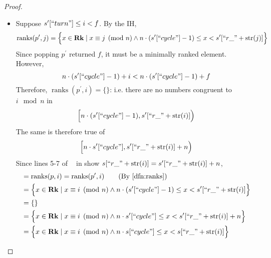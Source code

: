 \documentclass{amsart}
\DeclareMathOperator{\Rk}{\mathbf{Rk}}
\DeclareMathOperator{\zpostpop}{z_{\mathrm{post-pop}}}
\DeclareMathOperator{\ranks}{\mathrm{ranks}}
\theoremstyle{definition}
\begin{document}
\begin{proof}
\begin{enumerate}
\begin{enumerate}
\begin{itemize}
                        \item Suppose $s^\prime[``turn"] \leq i < f$.
                            By the IH,
                            $$
                                \ranks(p^\prime, j) = 
                                \Big\{x \in \Rk \mid x \equiv j \pmod n \land n \cdot (s^\prime[``cycle"] - 1) \leq x < s^\prime[``r\_" + \mathrm{str}(j)]\Big\}
                            $$
                            Since popping $p^\prime$ returned $f$, it must be a minimally ranked element.
                            However,
                            $$
                                n \cdot (s^\prime[``cycle"] - 1) + i
                                < 
                                n \cdot (s^\prime[``cycle"] - 1) + f
                            $$
                            Therefore, $\ranks(p^\prime, i) = \{\}$:
                            i.e. there are no numbers congruent to $i \mod n$ in
                            $$
                                \Big[n \cdot (s^\prime[``cycle"] - 1), s^\prime[``r\_" + \mathrm{str}(i)]\Big)
                            $$
                            The same is therefore true of
                            $$
                                \Big[n \cdot s^\prime[``cycle"], s^\prime[``r\_" + \mathrm{str}(i)] + n\Big)
                            $$
                            Since lines 5-7 of $\zpostpop$ in  show
                            $s[``r\_" + \mathrm{str}(i)] = s^\prime[``r\_" + \mathrm{str}(i)] + n$,
                            \begin{align*}
                                &= \ranks(p, i) = \ranks(p^\prime, i) \tag{By \Cref{dfn:ranks}}\\
                                &=
                                \Big\{x \in \Rk \mid x \equiv i \pmod n \land n \cdot (s^\prime[``cycle"] - 1) \leq x < s^\prime[``r\_" + \mathrm{str}(i)]\Big\}\\
                                &= \{\}\\
                                &=
                                \Big\{x \in \Rk \mid x \equiv i \pmod n \land n \cdot s^\prime[``cycle"] \leq x < s^\prime[``r\_" + \mathrm{str}(i)] + n\Big\}\\
                                &=
                                \Big\{x \in \Rk \mid x \equiv i \pmod n \land n \cdot s[``cycle"] \leq x < s[``r\_" + \mathrm{str}(i)] \Big\} 
                            \end{align*}


\end{itemize}
\end{enumerate}
\end{enumerate}
\end{proof}
\end{document}
